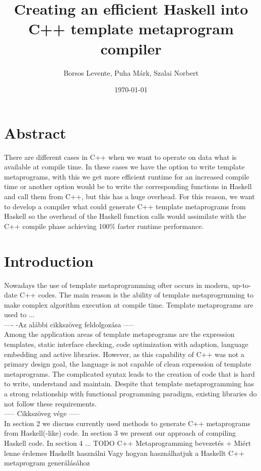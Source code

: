 \documentclass[twocolumn]{article}
\title{Creating an efficient Haskell into C++ template metaprogram compiler}
\date{\today}
\author{Borsos Levente, Puha Márk, Szalai Norbert}
\begin{document}
  \maketitle
  \newpage


\section*{Abstract}

There are different cases in C++ when we want to operate on data what is available at compile time. In these cases we have the option to write template metaprograms, with this we get more efficient runtime for an increased compile time or another option would be to write the corresponding functions in Haskell and call them from C++, but this has a huge overhead.  For this reason, we want to develop a compiler what could generate  C++ template metaprograms from Haskell so the overhead of the Haskell function calls would assimilate with the C++ compile phase achieving 100\% faster runtime performance.

\section{Introduction}
Nowadays the use of template metaprogramming ofter occurs in modern, up-to-date C++ codes. The main reason is the ability of template metaprogrmming to make complex algorithm execution at compile time. Template metaprograms are used to ... \\ ---- -Az alábbi cikkszöveg feldolgozása ----- \\ Among the application areas of template metaprograms are
the expression templates, static interface checking, code optimization with adaption, language embedding and active libraries. However, as this capability of C++ was not a primary design goal, the
language is not capable of clean expression of template metaprograms. The complicated syntax leads to the creation of code that
is hard to write, understand and maintain. Despite that template
metaprogramming has a strong relationship with functional programming paradigm, existing libraries do not follow these requirements. \\ ----- Cikkszöveg vége ----- \cite{porkolab2009c++}  \\
In section 2 we discuss currently used methods to generate C++ metaprograms from Haskell(-like) code. In section 3 we present our approach of compiling Haskell code. In section 4 ... TODO
\colorbox{orange!30}{C++ Metaprogramming bevezetés}
\colorbox{orange!30}{+ Miért lenne érdemes Haskellt használni}
\colorbox{orange!30}{Vagy hogyan használhatjuk a Haskellt} 
\colorbox{orange!30}{C++ metaprogram generálásához}
\end{document}
